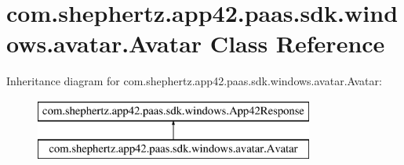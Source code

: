 \hypertarget{classcom_1_1shephertz_1_1app42_1_1paas_1_1sdk_1_1windows_1_1avatar_1_1_avatar}{\section{com.\+shephertz.\+app42.\+paas.\+sdk.\+windows.\+avatar.\+Avatar Class Reference}
\label{classcom_1_1shephertz_1_1app42_1_1paas_1_1sdk_1_1windows_1_1avatar_1_1_avatar}
}
Inheritance diagram for com.\+shephertz.\+app42.\+paas.\+sdk.\+windows.\+avatar.\+Avatar\+:\begin{figure}[H]
\begin{center}
\leavevmode
\includegraphics[height=2.000000cm]{classcom_1_1shephertz_1_1app42_1_1paas_1_1sdk_1_1windows_1_1avatar_1_1_avatar}
\end{center}
\end{figure}
